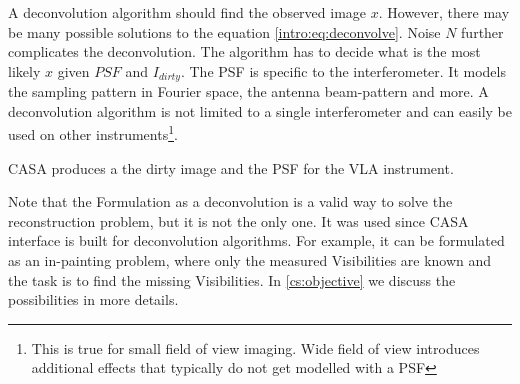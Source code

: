 A deconvolution algorithm should find the observed image $x$. However, there may be many possible solutions to the equation \eqref{intro:eq:deconvolve}. Noise $N$ further complicates the deconvolution. The algorithm has to decide what is the most likely $x$ given $PSF$ and $I_{dirty}$. The PSF is specific to the interferometer. It models the sampling pattern in Fourier space, the antenna beam-pattern and more. A deconvolution algorithm is not limited to a single interferometer and can easily be used on other instruments\footnote{This is true for small field of view imaging. Wide field of view introduces additional effects that typically do not get modelled with a PSF}.

CASA produces a the dirty image and the PSF for the VLA instrument.

Note that the Formulation as a deconvolution is a valid way to solve the reconstruction problem, but it is not the only one. It was used since CASA interface is built for deconvolution algorithms. For example, it can be formulated as an in-painting problem, where only the measured Visibilities are known and the task is to find the missing Visibilities. In \ref{cs:objective} we discuss the possibilities in more details.


